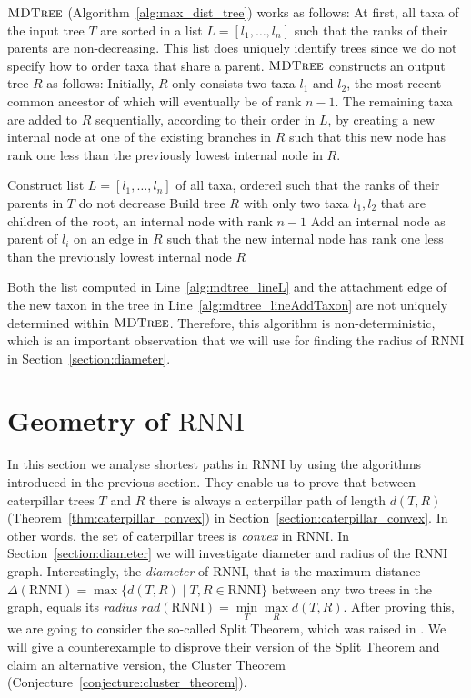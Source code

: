 \documentclass{amsart}
\newcommand{\rnni}{\mathrm{RNNI}}
\newcommand{\mdtree}{\textsc{MDTree}}
\begin{document}
$\mdtree$ (Algorithm~\ref{alg:max_dist_tree}) works as follows:
At first, all taxa of the input tree $T$ are sorted in a list $L = [l_1, \ldots, l_n]$ such that the ranks of their parents are non-decreasing.
This list does uniquely identify trees since we do not specify how to order taxa that share a parent.
$\mdtree$ constructs an output tree $R$ as follows:
Initially, $R$ only consists two taxa $l_1$ and $l_2$, the most recent common ancestor of which will eventually be of rank $n - 1$.
The remaining taxa are added to $R$ sequentially, according to their order in $L$, by creating a new internal node at one of the existing branches in $R$ such that this new node has rank one less than the previously lowest internal node in $R$.

\begin{algorithm}[H]
\caption{$\mdtree(T)$}
\label{alg:max_dist_tree}
\begin{algorithmic}[1]
\STATE Construct list $L=[l_1, \ldots, l_n]$ of all taxa, ordered such that the ranks of their parents in $T$ do not decrease \label{alg:mdtree_lineL}
\STATE Build tree $R$ with only two taxa $l_1, l_2$ that are children of the root, an internal node with rank $n-1$
\STATE Add an internal node as parent of $l_i$ on an edge in $R$ such that the new internal node has rank one less than the previously lowest internal node \label{alg:mdtree_lineAddTaxon}
\ENDFOR
\RETURN $R$
\end{algorithmic}
\end{algorithm}

Both the list computed in Line~\ref{alg:mdtree_lineL} and the attachment edge of the new taxon in the tree in Line~\ref{alg:mdtree_lineAddTaxon} are not uniquely determined within $\mdtree$.
Therefore, this algorithm is non-deterministic, which is an important observation that we will use for finding the radius of $\rnni$ in Section~\ref{section:diameter}.


\section{Geometry of $\rnni$}
\label{section:geometry}

In this section we analyse shortest paths in $\rnni$ by using the algorithms introduced in the previous section.
They enable us to prove that between caterpillar trees $T$ and $R$ there is always a caterpillar path of length $d(T,R)$ (Theorem~\ref{thm:caterpillar_convex}) in Section~\ref{section:caterpillar_convex}.
In other words, the set of caterpillar trees is \emph{convex} in $\rnni$.
In Section~\ref{section:diameter} we will investigate diameter and radius of the $\rnni$ graph.
Interestingly, the \emph{diameter} of $\rnni$, that is the maximum distance $\Delta(\rnni) = \max \{d(T, R) \mid T, R \in \rnni\}$ between any two trees in the graph, equals its \emph{radius} $rad(\rnni) = \min\limits_T \max\limits_R d(T,R)$.
After proving this, we are going to consider the so-called Split Theorem, which was raised in \autocite{Gavryushkin2018-ol}.
We will give a counterexample to disprove their version of the Split Theorem and claim an alternative version, the Cluster Theorem (Conjecture~\ref{conjecture:cluster_theorem}).
\end{document}
